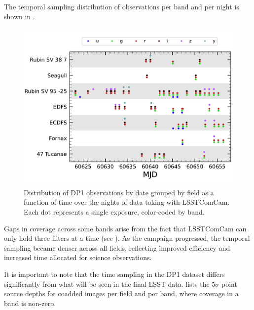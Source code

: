 The temporal sampling distribution of observations per band and per night is shown in .
\begin{figure}[htb!]
\includegraphics[width=\linewidth]{visitDates}
\caption{Distribution of DP1 observations by date grouped by field as a function of time over the \nnightscomcam nights of data taking with LSSTComCam.
Each dot represents a single  exposure, color-coded by band.}
\label{fig:target_fields_temporal_sampling}
\end{figure}
Gaps in coverage across some bands arise from the fact that \gls{LSSTComCam} can only hold three filters at a time (see ).
As the campaign progressed, the temporal sampling became denser across all fields, reflecting improved efficiency and increased time allocated for science observations.

It is important to note that the time sampling in the \gls{DP1} dataset differs significantly from what will be seen in the final \gls{LSST} data.
 lists the  5$\sigma$ point source depths for coadded images per field and per band, where coverage in a band is non-zero.



